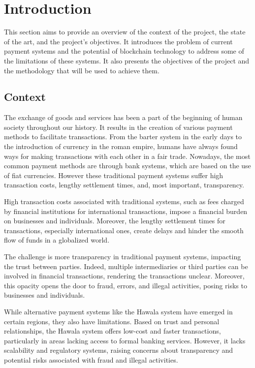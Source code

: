 \chapter{Introduction}
\label{ch:introduction}

This section aims to provide an overview of the context of the project, the state of the art, and the project's objectives. It introduces the
problem of current payment systems and the potential of blockchain technology to address some of the limitations of these systems. It also presents the
objectives of the project and the methodology that will be used to achieve them.

\minitoc



\section{Context}
\label{sec:ch1_context}

The exchange of goods and services has been a part of the beginning of human society throughout our history. It results in the creation of various payment methods
to facilitate transactions. From the barter system in the early days to the introduction of currency in the roman empire, humans
have always found ways for making transactions with each other in a fair trade. 
Nowadays, the most common payment methods are through bank systems, which are based on the use of fiat currencies. However these traditional payment systems
suffer high transaction costs, lengthy settlement times, and, most important, transparency.

High transaction costs associated with traditional systems, such as fees charged by financial institutions for international transactions,
impose a financial burden on businesses and individuals. Moreover, the lengthy settlement times for
transactions, especially international ones, create delays and hinder the smooth flow of funds in a globalized world.

The challenge is more transparency in traditional payment systems, impacting the trust between parties. Indeed,
multiple intermediaries or third parties can be involved in financial transactions, rendering the transactions unclear. Moreover, this opacity opens
the door to fraud, errors, and illegal activities, posing risks to businesses and individuals.


While alternative payment systems like the Hawala system have emerged in certain regions, they also have limitations. Based on trust and personal relationships, the Hawala system offers low-cost and faster transactions, particularly in areas lacking access to formal banking services. However, it lacks scalability and regulatory systems, raising concerns about transparency and potential risks associated with fraud and illegal activities.


